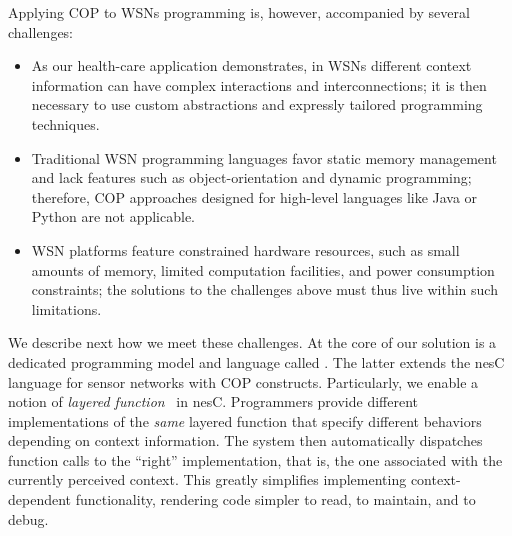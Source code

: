 Applying COP to WSNs programming is, however, accompanied by several challenges:
\begin{itemize}\compresslist
\item As our health-care application demonstrates, in WSNs
  different context information can have complex interactions and
  interconnections; it is then necessary to use custom abstractions
  and expressly tailored programming techniques.
\item Traditional WSN programming languages favor static memory
  management and lack features such as object-orientation and dynamic
  programming; therefore, COP approaches designed for high-level
  languages like Java or Python are not applicable.
\item WSN platforms feature constrained hardware resources, such as
  small amounts of memory, limited computation facilities, and power
  consumption constraints; the solutions to the challenges above must
  thus live within such limitations.
\end{itemize}

We describe next how we meet these challenges. At the core of our
solution is a dedicated programming model and language called
{}. The latter extends the nesC~\cite{gay03:nesc}
language for sensor networks with COP constructs. Particularly, we
enable a notion of \emph{layered function}~\cite{hirschfeld08} in
nesC. Programmers provide different implementations of the \emph{same}
layered function that specify different behaviors depending on context
information. The system then automatically dispatches function calls
to the ``right'' implementation, that is, the one associated with the
currently perceived context. This greatly simplifies implementing
context-dependent functionality, rendering code
simpler to read, to maintain, and to debug.


